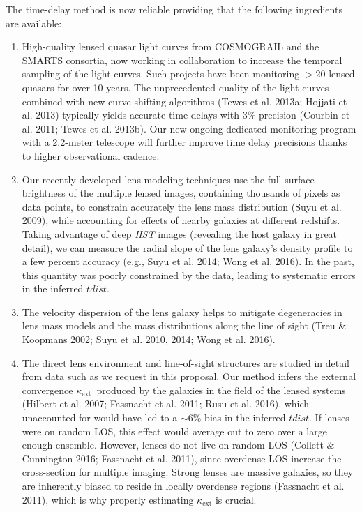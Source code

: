 \documentclass[a4paper,11pt]{article}
\begin{document}
The time-delay method is now reliable providing that the following ingredients are available:
\begin{enumerate}
\item High-quality lensed quasar light curves from COSMOGRAIL and the SMARTS consortia, now
working in collaboration to increase the temporal sampling of the light curves. Such projects
have been monitoring $>20$ lensed quasars for over 10 years. The unprecedented quality of the light
curves combined with new curve shifting algorithms (Tewes et al. 2013a; Hojjati et al. 2013)
typically yields accurate time delays with 3\% precision (Courbin et al. 2011; Tewes et al. 2013b).  Our new ongoing dedicated monitoring program with a 2.2-meter telescope will further improve time delay precisions thanks to higher observational cadence.
\item Our recently-developed lens modeling techniques use the full surface brightness of the multiple
lensed images, containing thousands of pixels as data points, to constrain accurately the lens
mass distribution (Suyu et al. 2009), while accounting for effects of nearby galaxies at different redshifts. Taking advantage of deep {\it HST} images (revealing the host
galaxy in great detail), we can measure the radial slope of the lens galaxy's density profile to a few
percent accuracy (e.g., Suyu et al. 2014; Wong et al. 2016). In the past, this quantity was poorly constrained by the
data, leading to systematic errors in the inferred $t dist$.
\item The velocity dispersion of the lens galaxy helps to mitigate degeneracies in lens mass
models and the mass distributions along the line of sight (Treu \& Koopmans 2002; Suyu et al.
2010, 2014; Wong et al. 2016).
\item The direct lens environment and line-of-sight structures are studied in detail from data such as we request in this proposal. Our method infers the external convergence $\kappa_\mathrm{ext}$~produced by the galaxies in the field of the lensed systems (Hilbert et al. 2007; Fassnacht et al. 2011; Rusu et al. 2016), which unaccounted for would have led to a $\sim6\%$ bias in the inferred $t dist$. If lenses were on random LOS, this effect would average out to zero over a large enough ensemble. However, lenses do not live on random LOS (Collett \& Cunnington 2016; Fassnacht et al. 2011), since overdense LOS increase the cross-section for multiple imaging. Strong lenses are massive galaxies, so they are inherently biased to reside in locally overdense regions (Fassnacht et al. 2011), which is why properly estimating $\kappa_\mathrm{ext}$ is crucial.
\end{enumerate}
\end{document}
